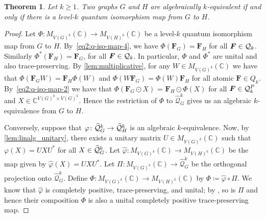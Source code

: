 \documentclass[11pt,a4paper]{article}
\theoremstyle{plain}
\newtheorem{thm}{Theorem}[section]
\theoremstyle{remark}
\theoremstyle{definition}
\newcommand{\complex}{\mathbb{C}}
\begin{document}
\begin{thm}\label{thm:main-theorem-2}
  Let $k\geq 1$. 
  Two graphs $G$ and $H$ are algebraically $k$-equivalent if and only if there is a level-$k$ quantum isomorphism map from $G$ to $H$.
\end{thm}
\begin{proof}
  Let $\Phi\colon M_{V(G)^k}(\complex) \to M_{V(H)^k}(\complex)$ be a level-$k$ quantum isomorphism map from $G$ to $H$.
  By~\eqref{eq2:q-iso-map-4}, we have $\Phi(\boldsymbol{F}_G) = \boldsymbol{F}_H$ for all $\boldsymbol{F}\in {\mathcal Q}_k$. 
  Similarly $\Phi^*(\boldsymbol{F}_H) = \boldsymbol{F}_G$, for all $\boldsymbol{F}\in {\mathcal Q}_k$.
  In particular, $\Phi$ and $\Phi^*$ are unital and also trace-preserving. 
  By \cref{lem:multiplicative}, for any $W \in M_{V(G)^k}(\mathbb{C})$ we have that $\Phi(\boldsymbol{F}_GW) = \boldsymbol{F}_H\Phi(W)$ and $\Phi(W\boldsymbol{F}_G) = \Phi(W)\boldsymbol{F}_H$ for all atomic $\boldsymbol{F} \in Q_k$.
  By~\eqref{eq2:q-iso-map-2} we have that $\Phi(\boldsymbol{F}_G\odot X)$ = $\boldsymbol{F}_H\odot\Phi(X)$ for all $\boldsymbol{F} \in {\mathcal Q}_k^P$ and $X \in \complex^{V(G)^k\times V(G)^k}$. Hence the restriction of $\Phi$ to $\widehat{\mathcal{Q}}_G^k$ gives us an algebraic $k$-equivalence from $G$ to $H$. 
  
      Conversely, suppose that $\varphi \colon \widehat{{\mathcal Q}}^k_G \to\widehat{{\mathcal Q}}^k_H$ is an algebraic $k$-equivalence. Now, by \cref{lem:linalg_unitary}, there exists a unitary matrix $U \in M_{{V(G)}^k}(\mathbb{C})$ such that $\varphi(X) = UXU^*$ for all $X \in \widehat{{\mathcal Q}}^k_G$.
		Let $\widehat{\varphi} \colon M_{V(G)^k}(\complex) \to M_{V(H)^k}(\complex)$ be the map given by $\widehat{\varphi}(X) = UXU^*$.
		Let $\Pi \colon M_{V(G)^k}(\complex) \to \widehat{\mathcal{Q}}^k_G$ be the orthogonal projection onto $\widehat{\mathcal{Q}}^k_G$.
		Define $\Phi \colon M_{V(G)^k}(\complex) \to M_{V(H)^k}(\complex)$ by $\Phi \coloneqq \widehat{\varphi} \circ \Pi$.
		We know that $\widehat{\varphi}$ is completely positive, trace-preserving, and unital; by \cite[Lemma~5.4]{david_mathprog}, so is $\Pi$ and hence their composition $\Phi$ is also a unital completely positive trace-preserving map. 
		

\end{proof}
\end{document}
